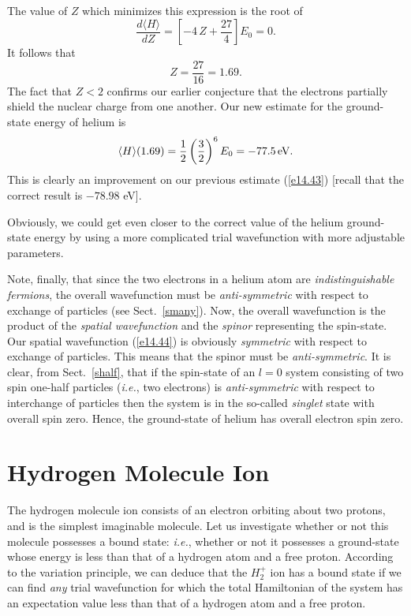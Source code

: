 The value of $Z$ which minimizes this expression is the root of
\begin{equation}
\frac{d\langle H\rangle}{dZ} = \left[-4\,Z+ \frac{27}{4}\right] E_0 = 0.
\end{equation}
It follows that
\begin{equation}
Z = \frac{27}{16} = 1.69.
\end{equation}
The fact that $Z<2$ confirms our earlier conjecture that the electrons partially
shield the nuclear charge from one another. Our new estimate
for the ground-state energy of helium is
\begin{equation}
\langle H\rangle(1.69) = \frac{1}{2}\left(\frac{3}{2}\right)^6 E_0 = -77.5\,{\rm eV}.
\end{equation}
This is clearly an improvement on our previous estimate (\ref{e14.43}) [recall that the
correct result is $-78.98$ eV].

Obviously, we could get even closer to the correct value of the
helium ground-state energy by using a
more complicated trial wavefunction with more adjustable parameters.

Note, finally, that since the two electrons in a helium atom are {\em indistinguishable fermions}, the overall wavefunction must be {\em anti-symmetric}\/ with respect to exchange of particles (see Sect.~\ref{smany}).
Now, the overall wavefunction is the product of the {\em spatial wavefunction}\/
and the {\em spinor}\/ representing the spin-state. Our spatial wavefunction (\ref{e14.44}) is obviously {\em symmetric}\/ with respect to exchange of
particles. This means that the spinor must be {\em anti-symmetric}. 
It is clear, from Sect.~\ref{shalf},  that if the spin-state of
an $l=0$ system consisting of two spin one-half particles ({\em i.e.}, two electrons)
is {\em anti-symmetric}\/ with respect to interchange of particles then the system is
in the so-called {\em singlet}\/ state with overall spin zero. Hence,
the ground-state of helium has overall electron spin zero.

\section{Hydrogen Molecule Ion}
The hydrogen molecule ion consists of an electron orbiting about
two protons, and is the simplest imaginable molecule. Let us
investigate whether or not this molecule possesses a bound state: {\em i.e.}, whether or
not it possesses a ground-state whose energy is less than that of
a hydrogen atom and a free proton.
According
to the variation principle, we can deduce that the $H_2^+$ ion has a bound state if we can find {\em any}\/
trial wavefunction for which the total Hamiltonian of the system has an expectation value less than that of a hydrogen atom and a free proton.

